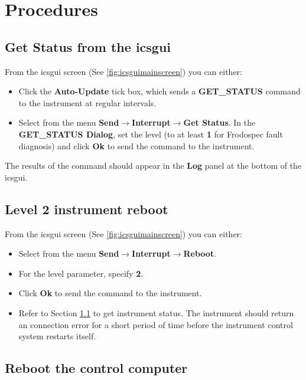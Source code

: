 \documentclass[10pt,a4paper]{article}
\begin{document}
\section{Procedures}

\subsection{Get Status from the icsgui}
\label{sec:icsguigetstatus}

From the icsgui screen (See \ref{fig:icsguimainscreen}) you can either:

\begin{itemize}
\item Click the {\bf Auto-Update} tick box, which sends a {\bf GET\_STATUS} command to the instrument at regular
  intervals.
\item Select from the menu {\bf Send$\rightarrow$Interrupt$\rightarrow$Get Status}. In the {\bf GET\_STATUS Dialog}, set the level
  (to at least {\bf 1} for Frodospec fault diagnosis) and click {\bf Ok} to send the command to the instrument.
\end{itemize}

The results of the command should appear in the {\bf Log} panel at the bottom of the icsgui.

\subsection{Level 2 instrument reboot}
\label{sec:level2instrumentreboot}

From the icsgui screen (See \ref{fig:icsguimainscreen}) you can either:

\begin{itemize}
\item Select from the menu {\bf Send$\rightarrow$Interrupt$\rightarrow$Reboot}.
\item For the level parameter, specify {\bf 2}.
\item Click {\bf Ok} to send the command to the instrument.
\item Refer to Section \ref{sec:icsguigetstatus} to get instrument status. The instrument should return an
  connection error for a short period of time before the instrument control system restarts itself.
\end{itemize}

\subsection{Reboot the control computer}
\label{sec:rebootcontrolcomputer}
\end{document}
